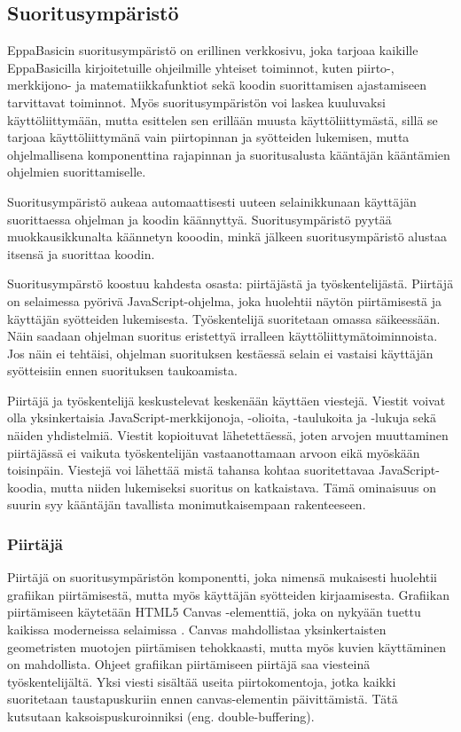 \subsection{Suoritusympäristö}
EppaBasicin suoritusympäristö on erillinen verkkosivu,
joka tarjoaa kaikille EppaBasicilla kirjoitetuille
ohjeilmille yhteiset toiminnot, kuten piirto-,
merkkijono- ja matematiikkafunktiot sekä
koodin suorittamisen ajastamiseen tarvittavat toiminnot.
Myös suoritusympäristön voi laskea kuuluvaksi käyttöliittymään,
mutta esittelen sen erillään muusta käyttöliittymästä,
sillä se tarjoaa käyttöliittymänä vain piirtopinnan
ja syötteiden lukemisen, mutta ohjelmallisena
komponenttina rajapinnan ja suoritusalusta kääntäjän
kääntämien ohjelmien suorittamiselle.

Suoritusympäristö aukeaa automaattisesti uuteen selainikkunaan
käyttäjän suorittaessa ohjelman ja koodin käännyttyä.
Suoritusympäristö pyytää muokkausikkunalta käännetyn kooodin,
minkä jälkeen suoritusympäristö alustaa itsensä ja suorittaa koodin.

Suoritusympärstö koostuu kahdesta osasta:
piirtäjästä ja työskentelijästä.
Piirtäjä on selaimessa pyörivä
JavaScript-ohjelma, joka huolehtii
näytön piirtämisestä ja käyttäjän syötteiden lukemisesta.
Työskentelijä suoritetaan omassa säikeessään.
Näin saadaan ohjelman suoritus eristettyä
irralleen käyttöliittymätoiminnoista.
Jos näin ei tehtäisi, ohjelman suorituksen
kestäessä selain ei vastaisi käyttäjän
syötteisiin ennen suorituksen taukoamista.

Piirtäjä ja työskentelijä keskustelevat
keskenään käyttäen viestejä.
Viestit voivat olla yksinkertaisia
JavaScript-merkkijonoja,
-olioita, -taulukoita ja -lukuja
sekä näiden yhdistelmiä.
Viestit kopioituvat lähetettäessä,
joten arvojen muuttaminen piirtäjässä
ei vaikuta työskentelijän vastaanottamaan
arvoon eikä myöskään toisinpäin.
Viestejä voi lähettää mistä tahansa kohtaa
suoritettavaa JavaScript-koodia,
mutta niiden lukemiseksi suoritus on katkaistava.
Tämä ominaisuus on suurin syy kääntäjän
tavallista monimutkaisempaan rakenteeseen.

\subsubsection{Piirtäjä}
Piirtäjä on suoritusympäristön komponentti,
joka nimensä mukaisesti huolehtii
grafiikan piirtämisestä,
mutta myös käyttäjän syötteiden kirjaamisesta.
Grafiikan piirtämiseen käytetään
HTML5 Canvas -elementtiä,
joka on nykyään tuettu kaikissa moderneissa
selaimissa \cite{caniuse_canvas}.
Canvas mahdollistaa yksinkertaisten
geometristen muotojen piirtämisen tehokkaasti,
mutta myös kuvien käyttäminen on mahdollista.
Ohjeet grafiikan piirtämiseen piirtäjä
saa viesteinä työskentelijältä.
Yksi viesti sisältää useita piirtokomentoja,
jotka kaikki suoritetaan taustapuskuriin ennen
canvas-elementin päivittämistä.
Tätä kutsutaan kaksoispuskuroinniksi
(eng. double-buffering).

